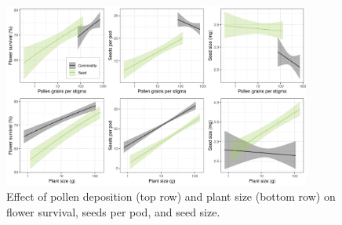 \documentclass[12pt]{article} %
\begin{document}

\begin{figure}
    \centering
    \includegraphics[width=0.9\textwidth,keepaspectratio=true]{../Figures/allSeeds.png}
    \caption{Effect of pollen deposition (top row) and plant size (bottom row) on flower survival, seeds per pod, and seed size.}
    \label{fig:allSeeds}
\end{figure}
\end{document}
